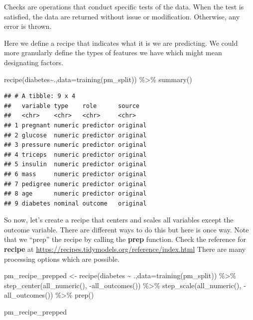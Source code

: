 \documentclass[
]{article}
\newenvironment{Shaded}{\begin{snugshade}}{\end{snugshade}}
\newcommand{\AttributeTok}[1]{\textcolor[rgb]{0.77,0.63,0.00}{#1}}
\newcommand{\FunctionTok}[1]{\textcolor[rgb]{0.00,0.00,0.00}{#1}}
\newcommand{\NormalTok}[1]{#1}
\newcommand{\OtherTok}[1]{\textcolor[rgb]{0.56,0.35,0.01}{#1}}
\newcommand{\SpecialCharTok}[1]{\textcolor[rgb]{0.00,0.00,0.00}{#1}}
\begin{document}
Checks are operations that conduct specific tests of the data. When the
test is satisfied, the data are returned without issue or modification.
Otherwise, any error is thrown.

Here we define a recipe that indicates what it is we are predicting. We
could more granularly define the types of features we have which might
mean designating factors.

\begin{Shaded}
\begin{Highlighting}[]
\FunctionTok{recipe}\NormalTok{(diabetes}\SpecialCharTok{\textasciitilde{}}\NormalTok{.,}\AttributeTok{data=}\FunctionTok{training}\NormalTok{(pm\_split)) }\SpecialCharTok{\%\textgreater{}\%} \FunctionTok{summary}\NormalTok{()}
\end{Highlighting}
\end{Shaded}

\begin{verbatim}
## # A tibble: 9 x 4
##   variable type    role      source  
##   <chr>    <chr>   <chr>     <chr>   
## 1 pregnant numeric predictor original
## 2 glucose  numeric predictor original
## 3 pressure numeric predictor original
## 4 triceps  numeric predictor original
## 5 insulin  numeric predictor original
## 6 mass     numeric predictor original
## 7 pedigree numeric predictor original
## 8 age      numeric predictor original
## 9 diabetes nominal outcome   original
\end{verbatim}

So now, let's create a recipe that centers and scales all variables
except the outcome variable. There are different ways to do this but
here is once way. Note that we ``prep'' the recipe by calling the
\textbf{prep} function. Check the reference for \textbf{recipe} at
\url{https://recipes.tidymodels.org/reference/index.html} There are many
processing options which are possible.

\begin{Shaded}
\begin{Highlighting}[]
\NormalTok{pm\_recipe\_prepped }\OtherTok{\textless{}{-}} \FunctionTok{recipe}\NormalTok{(diabetes }\SpecialCharTok{\textasciitilde{}}\NormalTok{ .,}\AttributeTok{data=}\FunctionTok{training}\NormalTok{(pm\_split)) }\SpecialCharTok{\%\textgreater{}\%}
  \FunctionTok{step\_center}\NormalTok{(}\FunctionTok{all\_numeric}\NormalTok{(), }\SpecialCharTok{{-}}\FunctionTok{all\_outcomes}\NormalTok{()) }\SpecialCharTok{\%\textgreater{}\%}
  \FunctionTok{step\_scale}\NormalTok{(}\FunctionTok{all\_numeric}\NormalTok{(), }\SpecialCharTok{{-}}\FunctionTok{all\_outcomes}\NormalTok{()) }\SpecialCharTok{\%\textgreater{}\%}
  \FunctionTok{prep}\NormalTok{()}

\NormalTok{pm\_recipe\_prepped}
\end{Highlighting}
\end{Shaded}
\end{document}
